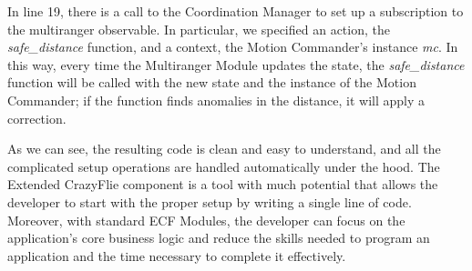 In line 19, there is a call to the Coordination Manager to set up a subscription to the multiranger observable. 
In particular, we specified an action, the \textit{safe\_distance} function, and a context, the Motion Commander's instance \textit{mc}. 
In this way, every time the Multiranger Module updates the state, the \textit{safe\_distance} function will be called with the new state and the instance of the Motion Commander; if the function finds anomalies in the distance, it will apply a correction.

As we can see, the resulting code is clean and easy to understand, and all the complicated setup operations are handled automatically under the hood.
The Extended CrazyFlie component is a tool with much potential that allows the developer to start with the proper setup by writing a single line of code. 
Moreover, with standard ECF Modules, the developer can focus on the application's core business logic and reduce the skills needed to program an application and the time necessary to complete it effectively. 
